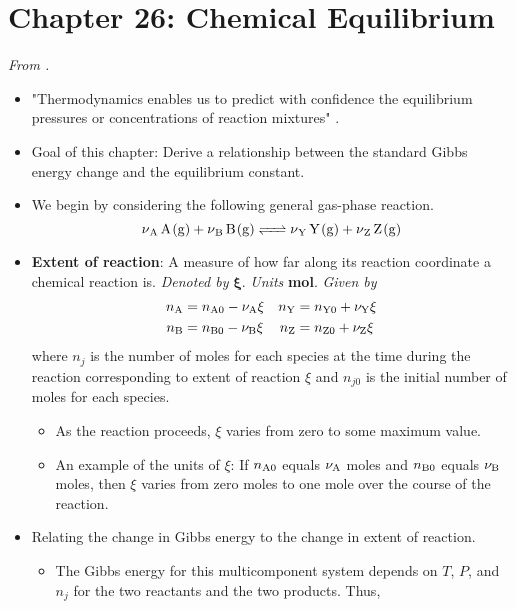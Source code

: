 \documentclass[../notes.tex]{subfiles}
\begin{document}
\section{Chapter 26: Chemical Equilibrium}
\emph{From \textcite{bib:McQuarrieSimon}.}
\begin{itemize}
    \item {}"Thermodynamics enables us to predict with confidence the equilibrium pressures or concentrations of reaction mixtures" \parencite[963]{bib:McQuarrieSimon}.
    \item Goal of this chapter: Derive a relationship between the standard Gibbs energy change and the equilibrium constant.
    \item We begin by considering the following general gas-phase reaction.
    \begin{equation*}
        \ce{\nu_{\ce{A}} A(g) + \nu_{\ce{B}} B(g) <=> \nu_{\ce{Y}} Y(g) + \nu_{\ce{Z}} Z(g)}
    \end{equation*}
    \item \textbf{Extent of reaction}: A measure of how far along its reaction coordinate a chemical reaction is. \emph{Denoted by} $\bm{\xi}$. \emph{Units} \textbf{mol}. \emph{Given by}
    \begin{align*}
        n_{\ce{A}} &= n_{\ce{A}0}-\nu_{\ce{A}}\xi&
            n_{\ce{Y}} &= n_{\ce{Y}0}+\nu_{\ce{Y}}\xi\\
        n_{\ce{B}} &= n_{\ce{B}0}-\nu_{\ce{B}}\xi&
            n_{\ce{Z}} &= n_{\ce{Z}0}+\nu_{\ce{Z}}\xi
    \end{align*}
    where $n_j$ is the number of moles for each species at the time during the reaction corresponding to extent of reaction $\xi$ and $n_{j0}$ is the initial number of moles for each species.
    \begin{itemize}
        \item As the reaction proceeds, $\xi$ varies from zero to some maximum value.
        \item An example of the units of $\xi$: If $n_{\ce{A}0}$ equals $\nu_{\ce{A}}$ moles and $n_{\ce{B}0}$ equals $\nu_{\ce{B}}$ moles, then $\xi$ varies from zero moles to one mole over the course of the reaction.
    \end{itemize}
    \item Relating the change in Gibbs energy to the change in extent of reaction.
    \begin{itemize}
        \item The Gibbs energy for this multicomponent system depends on $T$, $P$, and $n_j$ for the two reactants and the two products. Thus,

\end{itemize}
\end{itemize}
\end{document}
